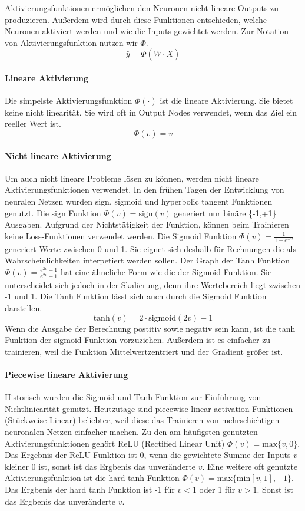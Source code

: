 Aktivierungsfunktionen ermöglichen den Neuronen nicht-lineare Outputs zu produzieren. Außerdem wird durch diese Funktionen entschieden, 
welche Neuronen aktiviert werden und wie die Inputs gewichtet werden. Zur Notation von Aktivierungsfunktion nutzen wir $\Phi$.
$$\hat{y} = \Phi(\overline{W} \cdot \overline{X})$$
\paragraph{Lineare Aktivierung}
Die simpelste Aktivierungsfunktion $\Phi(\cdot)$ ist die lineare Aktivierung. Sie bietet keine nicht linearität. Sie wird oft in Output Nodes
verwendet, wenn das Ziel ein reeller Wert ist.
$$\Phi(v) = v$$
\paragraph{Nicht lineare Aktivierung}
Um auch nicht lineare Probleme lösen zu können, werden nicht lineare Aktivierungsfunktionen verwendet. In den frühen Tagen der Entwicklung von neuralen Netzen wurden sign, sigmoid und hyperbolic tangent Funktionen genutzt.
Die sign Funktion $\Phi(v) = \text{sign}(v)$ generiert nur binäre \{-1,+1\} Ausgaben. Aufgrund der Nichtstätigkeit der Funktion, können beim Trainieren keine Loss-Funktionen verwendet werden.
Die Sigmoid Funktion $\Phi(v) = \frac{1}{1 + e^{-v}}$ generiert Werte zwischen 0 und 1. Sie eignet sich deshalb für Rechnungen die als Wahrscheinlichkeiten interpetiert werden sollen.
Der Graph der Tanh Funktion $\Phi(v) = \frac{e^{2v} - 1}{e^{2v} + 1}$ hat eine ähneliche Form wie die der Sigmoid Funktion. Sie unterscheidet sich jedoch in der Skalierung, denn ihre Wertebereich liegt zwischen -1 und 1.
Die Tanh Funktion lässt sich auch durch die Sigmoid Funktion darstellen.
$$\text{tanh}(v) = 2 \cdot \text{sigmoid}(2v) - 1$$
Wenn die Ausgabe der Berechnung postitiv sowie negativ sein kann, ist die tanh Funktion der sigmoid Funktion vorzuziehen. Außerdem ist es einfacher zu trainieren, weil die Funktion Mittelwertzentriert
und der Gradient größer ist.

\paragraph{Piecewise lineare Aktivierung}
Historisch wurden die Sigmoid und Tanh Funktion zur Einführung von Nichtliniearität genutzt. Heutzutage sind piecewise linear activation Funktionen (Stückweise Linear) beliebter, weil diese das Trainieren 
von mehrschichtigen neuronalen Netzen einfacher machen.
Zu den am häufigsten genutzten Aktivierungsfunktionen gehört ReLU (Rectified Linear Unit) $\Phi(v) = \text{max}\{v,0\}$. Das Ergebnis der ReLU Funktion ist 0, wenn die gewichtete Summe der Inputs $v$ kleiner 0 ist, sonst ist das Ergbenis das unveränderte $v$.
Eine weitere oft genutzte Aktivierungsfunktion ist die hard tanh Funktion $\Phi(v) = \text{max}\{\text{min}[v,1],-1\}$. Das Ergbenis der hard tanh Funktion ist -1 für $v < 1$ oder 1 für $v > 1$. Sonst ist das Ergbenis das unveränderte $v$. 

